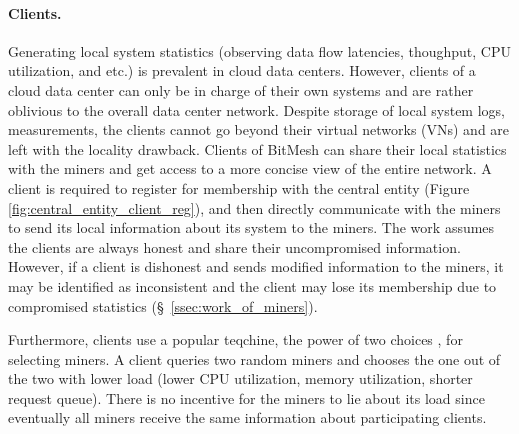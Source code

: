 \documentclass[11px]{article}
\newcommand{\projTitle}{BitMesh\xspace}
\begin{document}
\paragraph{Clients.} Generating local system statistics (observing data flow latencies, thoughput, CPU utilization, and etc.) is prevalent in cloud data centers. However, clients of a cloud data center can only be in charge of their own systems and are rather oblivious to the overall data center network. Despite storage of local system logs, measurements, the clients cannot go beyond their virtual networks (VNs) and are left with the locality drawback. Clients of \projTitle can share their local statistics with the miners and get access to a more concise view of the entire network. A client is required to register for membership with the central entity (Figure \ref{fig:central_entity_client_reg}), and then directly communicate with the miners to send its local information about its system to the miners. The work assumes the clients are always honest and share their uncompromised information. However, if a client is dishonest and sends modified information to the miners, it may be identified as inconsistent and the client may lose its membership due to compromised statistics (\S\ \ref{ssec:work_of_miners}).

\noindent \newline Furthermore, clients use a popular teqchine, the power of two choices \cite{power_of_two_choices}, for selecting  miners. A client queries two random miners and chooses the one out of the two with lower load (lower CPU utilization, memory utilization, shorter request queue). There is no incentive for the miners to lie about its load since eventually all miners receive the same information about participating clients.
\par
\end{document}
